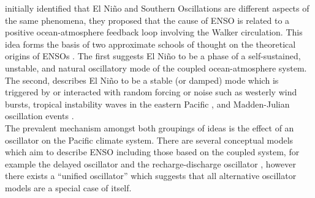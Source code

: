 \documentclass[12pt, onecolumn]{revtex4}    %
\begin{document}
\cite{doi:10.1175/1520-04931969097} initially identified that El Ni\~{n}o and Southern Oscillations are different aspects of the same phenomena, they proposed that the cause of ENSO is related to a positive ocean-atmosphere feedback loop involving the Walker circulation. This idea forms the basis of two approximate schools of thought on the theoretical origins of ENSOs \citep{wang2017nino}. The first suggests El Ni\~{n}o to be a phase of a self-sustained, unstable, and natural oscillatory mode of the coupled ocean-atmosphere system. The second, describes El Ni\~{n}o to be a stable (or damped) mode which is triggered by or interacted with random forcing or noise such as westerly wind bursts, tropical instability waves in the eastern Pacific \citep{An:2008aa}, and Madden-Julian oscillation events \citep{doi:10.1175/JAS4029.1}.  \\

The prevalent mechanism amongst both groupings of ideas is the effect of an oscillator on the Pacific climate system. There are several conceptual models which aim to describe ENSO including those based on the coupled system, for example the delayed oscillator \citep{Suarez:1988aa, Battisti:1988aa} and the recharge-discharge oscillator \citep{Jin:1997aa}, however there exists a ``unified oscillator'' \citep{Wang:2001aa} which suggests that all alternative oscillator models are a special case of itself. \\





\newpage

\nocite{ruddiman_climate}


\end{document}
